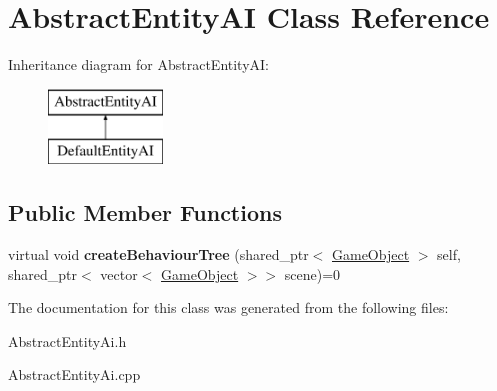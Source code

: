 \hypertarget{class_abstract_entity_a_i}{}\section{Abstract\+Entity\+AI Class Reference}
\label{class_abstract_entity_a_i}
Inheritance diagram for Abstract\+Entity\+AI\+:\begin{figure}[H]
\begin{center}
\leavevmode
\includegraphics[height=2.000000cm]{class_abstract_entity_a_i}
\end{center}
\end{figure}
\subsection*{Public Member Functions}
\begin{DoxyCompactItemize}
\item 
\mbox{\label{class_abstract_entity_a_i_a8dd5f0ed0b97b8089b1e0a7e67754bff}} 
virtual void {\bfseries create\+Behaviour\+Tree} (shared\+\_\+ptr$<$ \mbox{\hyperlink{class_game_object}{Game\+Object}} $>$ self, shared\+\_\+ptr$<$ vector$<$ \mbox{\hyperlink{class_game_object}{Game\+Object}} $>$$>$ scene)=0
\end{DoxyCompactItemize}


The documentation for this class was generated from the following files\+:\begin{DoxyCompactItemize}
\item 
Abstract\+Entity\+Ai.\+h\item 
Abstract\+Entity\+Ai.\+cpp\end{DoxyCompactItemize}
